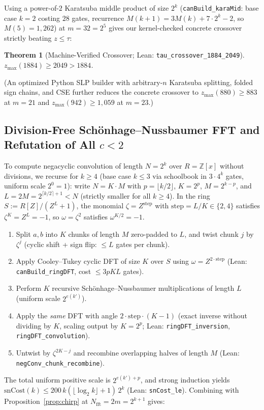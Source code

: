 \documentclass[11pt]{article}
\newtheorem{theorem}{Theorem}[section]
\newcommand{\Z}{\mathbb{Z}}
\newcommand{\code}[1]{\texttt{#1}}
\newcommand{\zmax}{z_{\max}}
\begin{document}
Using a power-of-$2$ Karatsuba middle product of size $2^k$ (\code{canBuild\_karaMid}: base case $k = 2$ costing $28$ gates, recurrence $M(k+1) = 3 M(k) + 7 \cdot 2^k - 2$, so $M(5) = 1{,}262$) at $m = 32 = 2^5$ gives our kernel-checked concrete crossover strictly beating $z \le \tau$:
\begin{theorem}[Machine-Verified Crossover; Lean: \code{tau\_crossover\_1884\_2049}]\label{thm:cross}
$\zmax(1884) \ge 2049 > 1884$.
\end{theorem}
\noindent (An optimized Python SLP builder with arbitrary-$n$ Karatsuba splitting, folded sign chains, and CSE further reduces the concrete crossover to $\zmax(880) \ge 883$ at $m = 21$ and $\zmax(942) \ge 1{,}059$ at $m = 23$.)

\subsection{Division-Free Sch\"onhage--Nussbaumer FFT and Refutation of All $c < 2$}
To compute negacyclic convolution of length $N = 2^k$ over $R = \Z[x]$ without divisions, we recurse for $k \ge 4$ (base case $k \le 3$ via schoolbook in $3 \cdot 4^k$ gates, uniform scale $2^0 = 1$): write $N = K \cdot M$ with $p = \lfloor k/2 \rfloor$, $K = 2^p$, $M = 2^{k-p}$, and $L = 2M = 2^{\lceil k/2 \rceil + 1} < N$ (strictly smaller for all $k \ge 4$). In the ring $S := R[Z]/(Z^L + 1)$, the monomial $\zeta = Z^{\mathrm{step}}$ with $\mathrm{step} = L/K \in \{2, 4\}$ satisfies $\zeta^K = Z^L = -1$, so $\omega = \zeta^2$ satisfies $\omega^{K/2} = -1$.
\begin{enumerate}[label=(\roman*),leftmargin=1.8em]
  \item Split $a, b$ into $K$ chunks of length $M$ zero-padded to $L$, and twist chunk $j$ by $\zeta^j$ (cyclic shift + sign flip: $\le L$ gates per chunk).
  \item Apply Cooley--Tukey cyclic DFT of size $K$ over $S$ using $\omega = Z^{2\cdot\mathrm{step}}$ (Lean: \code{canBuild\_ringDFT}, cost $\le 3 p K L$ gates).
  \item Perform $K$ recursive Sch\"onhage--Nussbaumer multiplications of length $L$ (uniform scale $2^{e(k')}$).
  \item Apply the \emph{same} DFT with angle $2 \cdot \mathrm{step} \cdot (K - 1)$ (exact inverse without dividing by $K$, scaling output by $K = 2^p$; Lean: \code{ringDFT\_inversion}, \code{ringDFT\_convolution}).
  \item Untwist by $\zeta^{2K - j}$ and recombine overlapping halves of length $M$ (Lean: \code{negConv\_chunk\_recombine}).
\end{enumerate}
The total uniform positive scale is $2^{e(k') + p}$, and strong induction yields $\mathrm{snCost}(k) \le 200\, k(\lfloor \log_2 k \rfloor + 1)\, 2^k$ (Lean: \code{snCost\_le}). Combining with Proposition~\ref{prop:chirp} at $N_{\mathrm{fft}} = 2m = 2^{k+1}$ gives:
\end{document}
